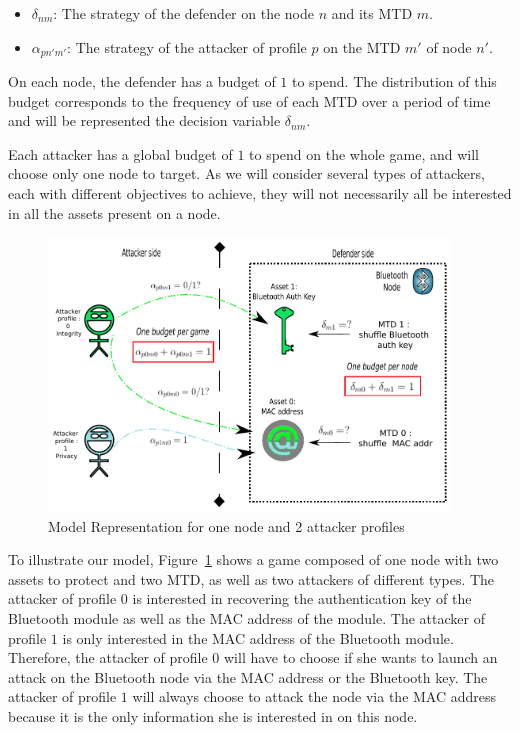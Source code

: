 \begin{itemize}
	\item $\delta_{nm}$: The strategy of the defender on the node $n$ and its MTD $m$.
	\item $\alpha_{pn'm'}$: The strategy of the attacker of profile $p$ on the MTD $m'$ of node $n'$.
\end{itemize}


On each node, the defender has a budget of $1$ to spend. The distribution of this budget corresponds to the frequency of use of each MTD over a period of time and will be represented the decision variable $\delta_{nm}$.

Each attacker has a global budget of $1$ to spend on the whole game, and will choose only one node to target. As we will consider several types of attackers, each with different objectives to achieve, they will not necessarily all be interested in all the assets present on a node. 

\begin{figure}[h]
    \centering
    \includegraphics[width=0.95\textwidth]{schema/node_archi_3.pdf}
    \caption{Model Representation for one node and 2 attacker profiles}
    \label{fig:node_pres}
\end{figure}

To illustrate our model, Figure~\ref{fig:node_pres} shows a game composed of one node with two assets to protect and two MTD, as well as two attackers of different types.
The attacker of profile $0$ is interested in recovering the authentication key of the Bluetooth module as well as the MAC address of the module.
The attacker of profile $1$ is only interested in the MAC address of the Bluetooth module. Therefore, the attacker of profile $0$ will have to choose if she wants to launch an attack on the Bluetooth node via the MAC address or the Bluetooth key. The attacker of profile $1$ will always choose to attack the node via the MAC address because it is the only information she is interested in on this node. 

